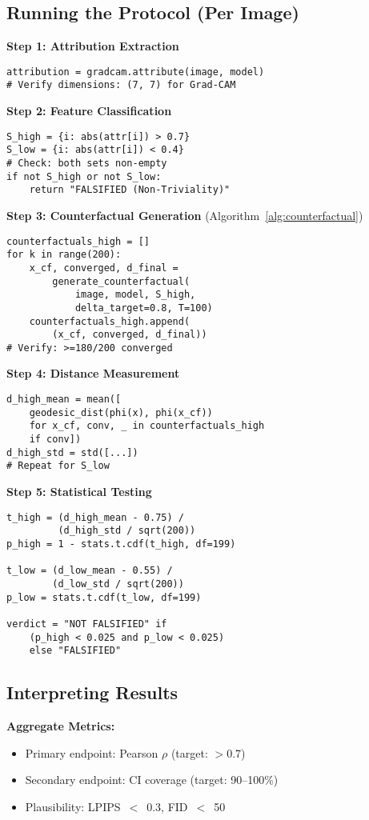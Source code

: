 \subsection{Running the Protocol (Per Image)}

\textbf{Step 1: Attribution Extraction}
\begin{verbatim}
attribution = gradcam.attribute(image, model)
# Verify dimensions: (7, 7) for Grad-CAM
\end{verbatim}

\textbf{Step 2: Feature Classification}
\begin{verbatim}
S_high = {i: abs(attr[i]) > 0.7}
S_low = {i: abs(attr[i]) < 0.4}
# Check: both sets non-empty
if not S_high or not S_low:
    return "FALSIFIED (Non-Triviality)"
\end{verbatim}

\textbf{Step 3: Counterfactual Generation} (Algorithm~\ref{alg:counterfactual})
\begin{verbatim}
counterfactuals_high = []
for k in range(200):
    x_cf, converged, d_final =
        generate_counterfactual(
            image, model, S_high,
            delta_target=0.8, T=100)
    counterfactuals_high.append(
        (x_cf, converged, d_final))
# Verify: >=180/200 converged
\end{verbatim}

\textbf{Step 4: Distance Measurement}
\begin{verbatim}
d_high_mean = mean([
    geodesic_dist(phi(x), phi(x_cf))
    for x_cf, conv, _ in counterfactuals_high
    if conv])
d_high_std = std([...])
# Repeat for S_low
\end{verbatim}

\textbf{Step 5: Statistical Testing}
\begin{verbatim}
t_high = (d_high_mean - 0.75) /
         (d_high_std / sqrt(200))
p_high = 1 - stats.t.cdf(t_high, df=199)

t_low = (d_low_mean - 0.55) /
        (d_low_std / sqrt(200))
p_low = stats.t.cdf(t_low, df=199)

verdict = "NOT FALSIFIED" if
    (p_high < 0.025 and p_low < 0.025)
    else "FALSIFIED"
\end{verbatim}

\subsection{Interpreting Results}

\textbf{Aggregate Metrics:}
\begin{itemize}
\item Primary endpoint: Pearson $\rho$ (target: $>$0.7)
\item Secondary endpoint: CI coverage (target: 90--100\%)
\item Plausibility: LPIPS~$<$~0.3, FID~$<$~50
\end{itemize}

